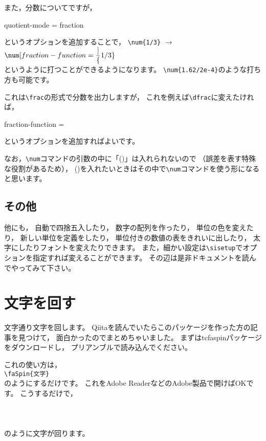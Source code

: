 また，分数についてですが，
\begin{ITeX}
quotient-mode = fraction
\end{ITeX}
というオプションを追加することで，
\hspace{5zw} \verb|\num{1/3}| $\rightarrow$ $\num[fraction-function = \dfrac]{1/3}$ \\
というように打つことができるようになります。
\verb|\num{1.62/2e-4}|のような打ち方も可能です。

これは\verb|\frac|の形式で分数を出力しますが，
これを例えば\verb|\dfrac|に変えたければ，
\begin{ITeX}
fraction-function = \dfrac
\end{ITeX}
というオプションを追加すればよいです。

なお，\verb|\num|コマンドの引数の中に「()」は入れられないので
（誤差を表す特殊な役割があるため），
()を入れたいときはその中で\verb|\num|コマンドを使う形になると思います。


\subsection{その他}
他にも，
自動で四捨五入したり，
数字の配列を作ったり，
単位の色を変えたり，
新しい単位を定義をしたり，
単位付きの数値の表をきれいに出したり，
太字にしたりフォントを変えたりできます。
また，細かい設定は\verb|\sisetup|でオプションを指定すれば変えることができます。
その辺は是非ドキュメントを読んでやってみて下さい。







\section{文字を回す}
文字通り文字を回します。
Qiitaを読んでいたらこのパッケージを作った方の記事を見つけて，
面白かったのでまとめちゃいました。
まずはtcfaspinパッケージをダウンロードし，
プリアンブルで読み込んでください。

これの使い方は，\\
\hspace{5zw} \verb|\faSpin{文字}| \\
のようにするだけです。
これをAdobe ReaderなどのAdobe製品で開けばOKです。
こうするだけで，\\
\vspace{3zw} \\
\hspace{5zw}  \\
\vspace{3zw} \\
のように文字が回ります。

